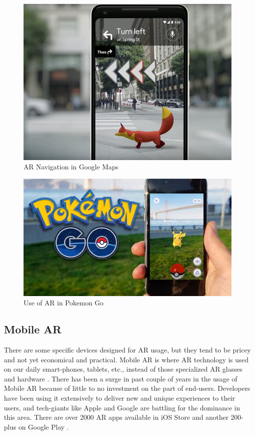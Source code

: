 \begin{figure}
    \centering
        \includegraphics[width=1.00\textwidth]{images/ar_navigation_maps.png}
    \caption{AR Navigation in Google Maps}
    \label{fig:ar_navigation_maps}
\end{figure}




\begin{figure}
    \centering
        \includegraphics[width=1.00\textwidth]{images/ar_pokemongo.jpg}
    \caption{Use of AR in Pokemon Go}
    \label{fig:ar_pokemongo}
\end{figure}

\subsection{Mobile AR}
There are some specific devices designed for AR usage, but they tend to be pricey and not yet economical and practical. Mobile AR is where AR technology is used on our daily smart-phones, tablets, etc., instead of those specialized AR glasses and hardware \cite{craig2013understanding}. There has been a surge in past couple of years in the usage of Mobile AR because of little to no investment on the part of end-users. Developers have been using it extensively to deliver new and unique experiences to their users, and tech-giants like Apple and Google are battling for the dominance in this area. There are over 2000 AR apps available in iOS Store and another 200-plus on Google Play \cite{Moon2018}.

